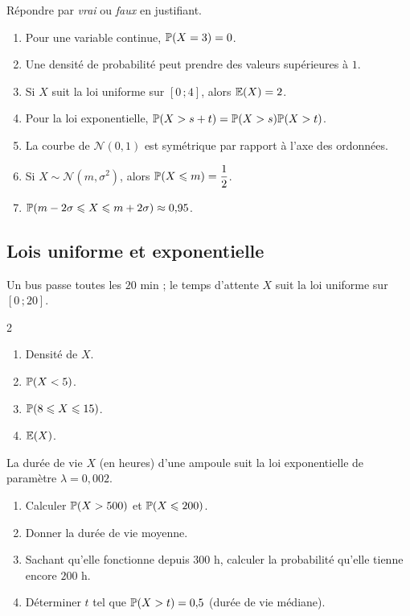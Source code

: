 Répondre par \emph{vrai} ou \emph{faux} en justifiant.
\begin{enumerate}
	\item Pour une variable continue, $\mathbb{P}(X=3)=0$.
	\item Une densité de probabilité peut prendre des valeurs supérieures à
	$1$.
	\item Si $X$ suit la loi uniforme sur $[0\,;4]$, alors $\mathbb{E}(X)=2$.
	\item Pour la loi exponentielle, $\mathbb{P}(X>s+t)=\mathbb{P}(X>s)\mathbb{P}(X>t)$.
	\item La courbe de $\mathscr{N}(0,1)$ est symétrique par rapport à l'axe
	des ordonnées.
	\item Si $X\sim\mathscr{N}(m,\sigma^2)$, alors
	$\mathbb{P}(X\leqslant m)=\dfrac12$.
	\item $\mathbb{P}(m-2\sigma\leqslant X\leqslant m+2\sigma)\approx 0{,}95$.
\end{enumerate}

\subsection{Lois uniforme et exponentielle}

Un bus passe toutes les $20$ min ; le temps d'attente $X$ suit la loi
uniforme sur $[0\,;20]$.
\begin{multicols}{2}
\begin{enumerate}
	\item Densité de $X$.
	\item $\mathbb{P}(X<5)$.
	\item $\mathbb{P}(8\leqslant X\leqslant 15)$.
	\item $\mathbb{E}(X)$.
\end{enumerate}
\end{multicols}

La durée de vie $X$ (en heures) d'une ampoule suit la loi exponentielle de
paramètre $\lambda=0{,}002$.
\begin{enumerate}
	\item Calculer $\mathbb{P}(X>500)$ et $\mathbb{P}(X\leqslant 200)$.
	\item Donner la durée de vie moyenne.
	\item Sachant qu'elle fonctionne depuis $300$ h, calculer la probabilité
	qu'elle tienne encore $200$ h.
	\item Déterminer $t$ tel que $\mathbb{P}(X>t)=0{,}5$ (durée de vie médiane).
\end{enumerate}

